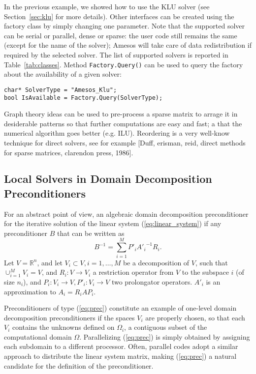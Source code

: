 \documentclass[acmtocl]{acmtrans2m}
\begin{document}
In the previous example, we showed how to use the KLU solver 
(see Section~\ref{sec:klu} for more details). Other interfaces
can be created using the factory class by simply changing one parameter. Note
that the supported solver can be serial or parallel, dense or sparse: the user
code still remains the same (except for the name of the solver); Amesos will
take care of data redistribution if required by the selected solver. The list
of supported solvers is reported in Table~\ref{tab:classes}. 
 Method
\verb!Factory.Query()! can be used to query the factory about the
availability of a given solver:
\begin{verbatim}
char* SolverType = "Amesos_Klu";
bool IsAvailable = Factory.Query(SolverType);
\end{verbatim}

\bigskip

Graph theory ideas can be used to pre-process a sparse matrix to arrage it in
desiderable patterns so that further computations are easy and fast; a that
the numerical algorithm goes better (e.g. ILU). Reordering is a very well-know
technique for direct solvers, see for example [Duff, erisman, reid, direct
methods for sparse matrices, clarendon press, 1986].

\subsection{Local Solvers in Domain Decomposition Preconditioners}
\label{sec:ifpack}

For an abstract point of view, an algebraic domain decomposition
preconditioner for the iterative solution of the linear system
(\ref{eq:linear_system})
if any preconditioner $B$ that can be written as
\begin{equation}
\label{eq:prec}
B^{-1} = \sum_{i=1}^M P'_i {A'_i}^{-1} R_i.
\end{equation}
Let $V = \mathbb{R}^n$, and
let $V_i \subset V, i = 1, \ldots, M$ be a decomposition of $V$, such that
$\cup_{i=1}^M V_i = V$, and $R_i: V \rightarrow V_i$ a restriction operator
from $V$ to the subspace $i$ (of size $n_i$),
and $P_i: V_i \rightarrow V, P'_i : V_i \rightarrow V$ two prolongator
operators. $A'_i$ is an approximation to $A_i = R_i A P_i$. 

Preconditioners of type (\ref{eq:prec}) constitute an example of one-level
domain decomposition preconditioners if the spaces $V_i$ are properly chosen,
so that each $V_i$ contains the unknowns defined on $\Omega_i$, a contiguous
subset of the computational domain $\Omega$. Parallelizing (\ref{eq:prec})
is simply obtained by assigning each subdomain to a different processor.
Often, parallel codes adopt a similar approach to distribute the linear
system matrix, making (\ref{eq:prec}) a natural candidate for the definition
of the preconditioner.
\end{document}
